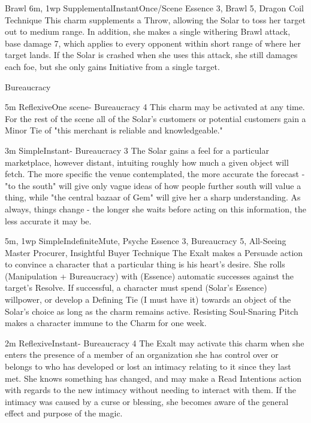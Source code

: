 \begin{Ability}{Brawl}
  {6m, 1wp}
  {Supplemental}{Instant}{Once/Scene}
  {Essence 3, Brawl 5, Dragon Coil Technique}
  This charm supplements a Throw, allowing the Solar to toss her target out to medium range. In addition, she makes a single withering Brawl attack, base damage 7, which applies to every opponent within short range of where her target lands. If the Solar is crashed when she uses this attack, she still damages each foe, but she only gains Initiative from a single target.

\end{Ability}

\begin{Ability}{Bureaucracy}

  {5m}
  {Reflexive}{One scene}{-}
  {Bureaucracy 4}
  This charm may be activated at any time. For the rest of the scene all of the Solar's customers or potential customers gain a Minor Tie of "this merchant is reliable and knowledgeable."

  {3m}
  {Simple}{Instant}{-}
  {Bureaucracy 3}
  The Solar gains a feel for a particular marketplace, however distant, intuiting roughly how much a given object will fetch. The more specific the venue contemplated, the more accurate the forecast - "to the south" will give only vague ideas of how people further south will value a thing, while "the central bazaar of Gem" will give her a sharp understanding. As always, things change - the longer she waits before acting on this information, the less accurate it may be.

  {5m, 1wp}
  {Simple}{Indefinite}{Mute, Psyche}
  {Essence 3, Bureaucracy 5, All-Seeing Master Procurer, Insightful Buyer Technique}
  The Exalt makes a Persuade action to convince a character that a particular thing is his heart's desire. She rolls (Manipulation + Bureaucracy) with (Essence) automatic successes against the target's Resolve. If successful, a character must spend (Solar's Essence) willpower, or develop a Defining Tie (I must have it) towards an object of the Solar's choice as long as the charm remains active. Resisting Soul-Snaring Pitch makes a character immune to the Charm for one week.

  {2m}
  {Reflexive}{Instant}{-}
  {Bureaucracy 4}
  The Exalt may activate this charm when she enters the presence of a member of an organization she has control over or belongs to who has developed or lost an intimacy relating to it since they last met. She knows something has changed, and may make a Read Intentions action with regards to the new intimacy without needing to interact with them. If the intimacy was caused by a curse or blessing, she becomes aware of the general effect and purpose of the magic.


\end{Ability}
